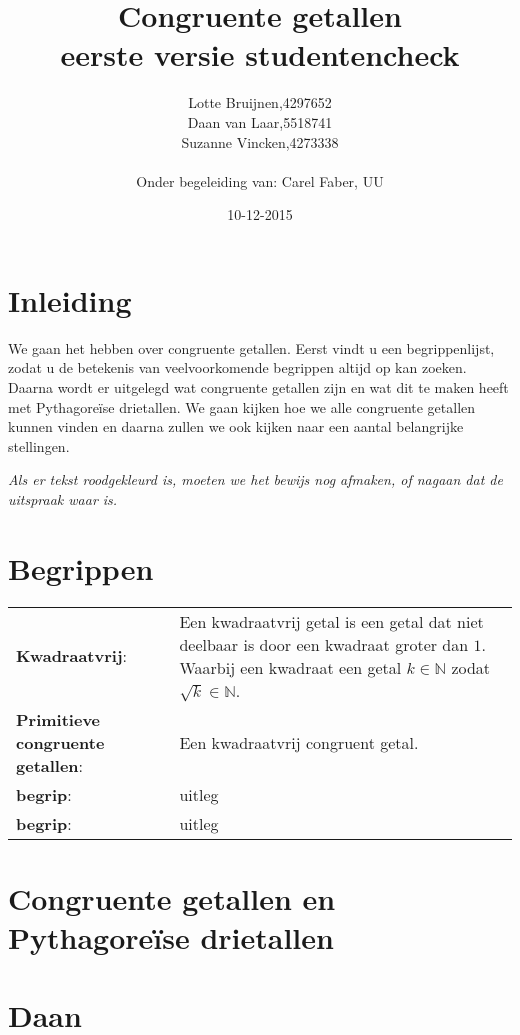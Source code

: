 \documentclass[12pt,reqno]{article}
\title{\textbf{Congruente getallen}\\
		\small{eerste versie studentencheck}}
\author{
	\begin{tabular}{ l l }
		Lotte Bruijnen, & 4297652 \\
		Daan van Laar, & 5518741 \\
		Suzanne Vincken, & 4273338
	\end{tabular}\\
	Onder begeleiding van: Carel Faber, UU
}
\date{10-12-2015}
\newcommand*{\NN}{\ensuremath{\mathbb{N}}}
\begin{document}
	
	\maketitle
	\allowdisplaybreaks
	
	
	\section{Inleiding}
	We gaan het hebben over congruente getallen. Eerst vindt u een begrippenlijst, zodat u de betekenis van veelvoorkomende begrippen altijd op kan zoeken. Daarna wordt er uitgelegd wat congruente getallen zijn en wat dit te maken heeft met Pythagore\"ise drietallen. We gaan kijken hoe we alle congruente getallen kunnen vinden en daarna zullen we ook kijken naar een aantal belangrijke stellingen.
	
	\textit{Als er tekst roodgekleurd is, moeten we het bewijs nog afmaken, of nagaan dat de uitspraak waar is.}
	
	
	\section{Begrippen}
	\begin{tabular}{ p{} p{10cm} }
		\textbf{Kwadraatvrij}: \cite{Beukers} & Een kwadraatvrij getal is een getal dat niet deelbaar is door een kwadraat groter dan $1$. Waarbij een kwadraat een getal $k\in\NN$ zodat $\sqrt{k}\in\NN$. \\
		\textbf{Primitieve congruente getallen}: & Een kwadraatvrij congruent getal. \\
		\textbf{begrip}: & uitleg \\
		\textbf{begrip}: & uitleg
	\end{tabular}
	
	\section{Congruente getallen en Pythagore\"{i}se drietallen}
	\section{Daan}
	
\end{document}

